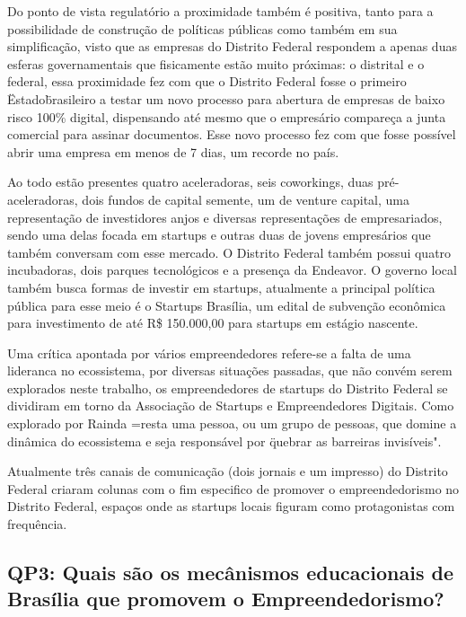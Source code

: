 Do ponto de vista regulatório a proximidade também é positiva, tanto para a possibilidade de construção de políticas públicas como também em sua simplificação, visto que as empresas do Distrito Federal respondem a apenas duas esferas governamentais que fisicamente estão muito próximas: o  distrital e o federal, essa proximidade fez com que o Distrito Federal fosse o primeiro \"Estado\" brasileiro a testar um novo processo para abertura de empresas de baixo risco 100\% digital, dispensando até mesmo que o empresário compareça a junta comercial para assinar documentos. Esse novo processo fez com que fosse possível abrir uma empresa em menos de 7 dias, um recorde no país.

Ao todo estão presentes quatro aceleradoras, seis coworkings, duas pré-aceleradoras, dois fundos de capital semente, um de venture capital, uma representação de investidores anjos e diversas representações de empresariados, sendo uma delas focada em startups e outras duas de jovens empresários que também conversam com esse mercado. O Distrito Federal também possui quatro incubadoras, dois parques tecnológicos e a presença da Endeavor. O governo local também busca formas de investir em startups, atualmente a principal política pública para esse meio é o Startups Brasília, um edital de subvenção econômica para investimento de até R\$ 150.000,00 para startups em estágio nascente.

Uma crítica apontada por vários empreendedores refere-se a falta de uma lideranca no ecossistema, por diversas situações passadas, que não convém serem explorados neste trabalho, os empreendedores de startups do Distrito Federal se dividiram em torno da Associação de Startups e Empreendedores Digitais. Como explorado por  Rainda =resta uma pessoa, ou um grupo de pessoas, que domine a dinâmica do ecossistema e seja responsável por \"quebrar as barreiras invisíveis".

Atualmente três canais de comunicação (dois jornais e um impresso) do Distrito Federal criaram colunas com o fim especifico de promover o empreendedorismo no Distrito Federal, espaços onde as startups locais figuram como protagonistas com frequência.


\subsection{QP3: Quais são os mecânismos educacionais de Brasília que promovem o Empreendedorismo?}
\label{subsection:pergunta_de_pesquisa_3}

